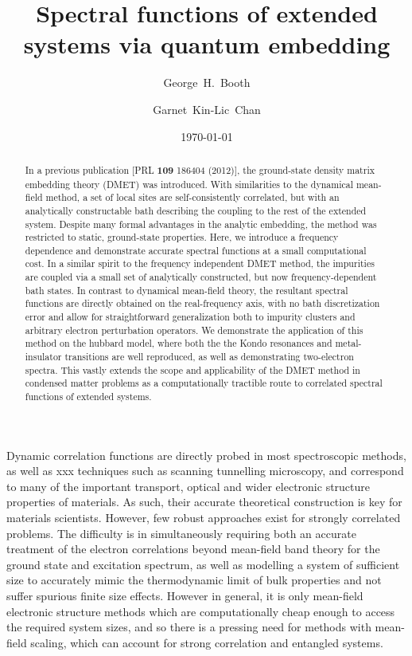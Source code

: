 \documentclass[aps,showpacs,twocolumn,nobibnotes]{revtex4}
\begin{document}
\title{Spectral functions of extended systems via quantum embedding}
\author{George~H.~Booth}
\author{Garnet~Kin-Lic~Chan}  

\begin{abstract}
In a previous publication [PRL {\bf 109} 186404 (2012)], the ground-state density matrix embedding theory (DMET) was introduced. With similarities 
to the dynamical mean-field method, a set of local sites are self-consistently correlated, but with an analytically constructable bath describing the
coupling to the rest of the extended system. 
Despite many formal advantages in the analytic embedding, the method was restricted to static, ground-state properties.
Here, we introduce a frequency dependence and demonstrate accurate spectral functions at a small 
computational cost. In a similar spirit to the frequency independent DMET method, the impurities are coupled via a small set of 
analytically constructed, but now frequency-dependent bath states. In contrast to dynamical mean-field theory, the resultant 
spectral functions are directly obtained on the real-frequency axis, with no bath discretization error and allow for straightforward generalization both 
to impurity clusters and arbitrary electron perturbation operators. We demonstrate
the application of this method on the hubbard model, where both the the Kondo resonances and metal-insulator transitions are well reproduced, as well as 
demonstrating two-electron spectra. This vastly extends the scope and applicability 
of the DMET method in condensed matter problems as a computationally tractible route to correlated spectral functions of extended systems.
\end{abstract}
\date{\today}
\maketitle

Dynamic correlation functions are directly probed in most spectroscopic methods, as well as xxx techniques such as scanning tunnelling microscopy, 
and correspond to many of the important transport, optical and 
wider electronic structure properties of materials. As such, their accurate theoretical construction is key for materials scientists. 
However, few robust approaches exist for strongly correlated problems. The difficulty is in simultaneously requiring both an accurate 
treatment of the electron correlations beyond mean-field band theory for the ground state and excitation spectrum, as well as modelling 
a system of sufficient size to accurately mimic the thermodynamic limit of bulk properties and not suffer spurious finite size effects. 
However in general, it is only mean-field electronic structure methods which are computationally cheap enough to access the required system
sizes, and so there is a pressing need for methods with mean-field scaling, which can account for strong correlation and entangled systems.
\end{document}
